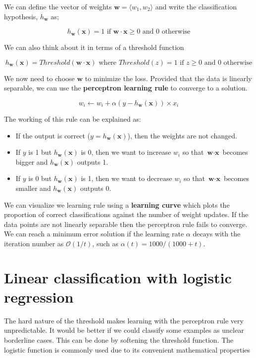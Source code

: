 \documentclass{article}
\begin{document}
We can define the vector of weights $\textbf{w} = \langle w_1, w_2 \rangle$ and write
the classification hypothesis, $h_{\textbf{w}}$ as;

\[
h_{\textbf{w}}(\textbf{x}) = \text{1 if $\textbf{w}\cdot\textbf{x} \ge 0$ and 0 otherwise}
\]

We can also think about it in terms of a threshold function

\[
h_{\textbf{w}}(\textbf{x}) = Threshold(\textbf{w}\cdot\textbf{x}) \text{ where $Threshold(z) = 1$ if $z \ge 0$ and 0 otherwise}
\]

We now need to choose $\textbf{w}$ to minimize the loss. Provided that the data is
linearly separable, we can use the \textbf{perceptron learning rule} to converge to
a solution.

\[
w_i \gets w_i + \alpha(y - h_{\textbf{w}}(\textbf{x})) \times x_i
\]

The working of this rule can be explained as:
\begin{itemize}
    \item If the output is correct ($y = h_{\textbf{w}}(\textbf{x})$), then the weights are not changed.
    \item If $y$ is 1 but $h_{\textbf{w}}(\textbf{x})$ is 0, then we want to increase $w_i$ so that
    $\textbf{w} \cdot \textbf{x}$ becomes bigger and $h_{\textbf{w}}(\textbf{x})$ outputs 1.
    \item If $y$ is 0 but $h_{\textbf{w}}(\textbf{x})$ is 1, then we want to decrease $w_i$ so that
    $\textbf{w} \cdot \textbf{x}$ becomes smaller and $h_{\textbf{w}}(\textbf{x})$ outputs 0.
\end{itemize}

We can visualize we learning rule using a \textbf{learning curve} which plots the proportion
of correct classifications against the number of weight updates. If the data points are not 
linearly separable then the perceptron rule fails to converge. We can reach a minimum
error solution if the learning rate $\alpha$ decays with the iteration number as
$\mathcal O(1/t)$, such as $\alpha(t) = 1000 / (1000 + t)$.

\section{Linear classification with logistic regression}

The hard nature of the threshold makes learning with the perceptron rule very
unpredictable. It would be better if we could classify some examples as unclear
borderline cases. This can be done by softening the threshold function. The logistic
function is commonly used due to its convenient mathematical properties
\end{document}
